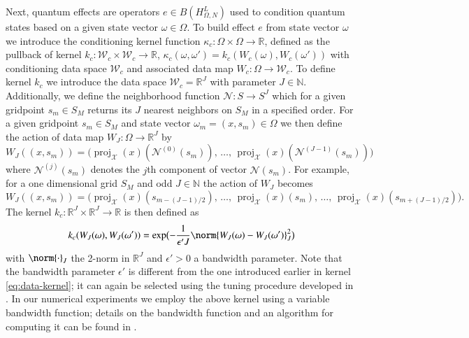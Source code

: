 \documentclass[letterpaper,10pt,3p,preprint]{elsarticle}
\newcommand{\Nbb}{\mathbb{N}}
\newcommand{\Rbb}{\mathbb{R}}
\newcommand{\Xcal}{\mathcal{X}}
\newcommand{\Wcal}{\mathcal{W}}
\DeclareMathOperator{\proj}{proj}
\begin{document}
Next, quantum effects are operators
$e\in B(H_{\Omega,N}^L)$
used to condition quantum states based on a given
state vector $\omega\in\Omega$.
To build effect $e$ from state vector $\omega$ we introduce
the conditioning kernel function
$\kappa_c\colon\Omega\times\Omega\to\Rbb$,
defined as the pullback of kernel
$k_c\colon\Wcal_c\times\Wcal_c\to\Rbb$,
$\kappa_c(\omega,\omega')=k_c(W_c(\omega),W_c(\omega'))$
with conditioning data space $\Wcal_c$
and associated data map $W_c\colon\Omega\to\Wcal_c$.
To define kernel $k_c$ we introduce the data space
$\Wcal_c=\Rbb^J$ with parameter $J\in\Nbb$.
Additionally, we define the neighborhood function
$\mathcal{N}\colon S\to S^J$
which for a given gridpoint $s_m\in S_M$
returns its $J$ nearest neighbors on $S_M$
in a specified order.
For a given gridpoint $s_m\in S_M$ and state vector
$\omega_m=(x,s_m)\in\Omega$
we then define the action of data map
$W_J\colon\Omega\to\Rbb^J$
by
\begin{equation*}
    W_J((x,s_m))=\bigl(
        \proj_\Xcal(x)(\mathcal{N}^{(0)}(s_m)),\,
        \ldots,\,
        \proj_\Xcal(x)(\mathcal{N}^{(J-1)}(s_m))\bigr)
\end{equation*}
where $\mathcal{N}^{(j)}(s_m)$ denotes the $j$th
component of vector $\mathcal{N}(s_m)$.
For example, for a one dimensional grid $S_M$
and odd $J\in\Nbb$ the action of $W_J$
becomes
\begin{equation*}
    W_J((x,s_m))=\bigl(\proj_\Xcal(x)(s_{m-(J-1)/2}),\,
        \ldots,\,\proj_\Xcal(x)(s_m),\,\ldots,\,
        \proj_\Xcal(x)(s_{m+(J-1)/2})\bigr).
\end{equation*}
The kernel $k_c\colon\Rbb^J\times\Rbb^J\to\Rbb$
is then defined as
\begin{equation}\label{eq:data-kernel-cond}
    k_c(W_J(\omega),W_J(\omega'))=
        \exp\bigl(-\frac{1}{\epsilon' J}
        \norm{W_J(\omega)-W_J(\omega')}_J^2\bigr)
\end{equation}
with $\norm{\cdot}_J$ the 2-norm in $\Rbb^J$ and
$\epsilon'>0$ a bandwidth parameter.
Note that the bandwidth parameter $\epsilon'$ is different
from the one introduced earlier in kernel
\eqref{eq:data-kernel};
it can again be selected using the tuning procedure developed in
\cite{Coifman2008}.
In our numerical experiments we employ the above kernel using a
variable bandwidth function; details on the bandwidth function
and an algorithm for computing it can be found in
\cite{Berry2016,Giannakis2019acha}.
\end{document}
